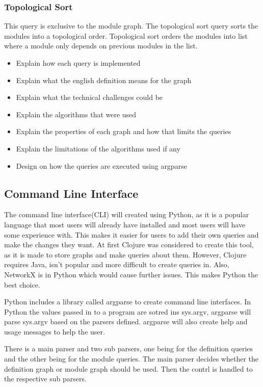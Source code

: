 \subsubsection{Topological Sort}

This query is exclusive to the module graph. The topological sort query sorts
the modules into a topological order. Topological sort orders the modules into
list where a module only depends on previous modules in the list.

\begin{itemize}
\item Explain how each query is implemented 
\item Explain what the english definition means for the graph 
\item Explain what the technical challenges could be 
\item Explain the algorithms that were used 
\item Explain the properties of each graph and how that limits the queries 
\item Explain the limitations of the algorithms used if any 
\item Design on how the queries are executed using argparse
\end{itemize}

\subsection{Command Line Interface}\label{sub:Agda Tree CLI}

The command line interface(CLI) will created using Python, as it is a popular
language that most users will already have installed and most users will have
some experience with. This makes it easier for users to add their own queries
and make the changes they want. At first Clojure was considered to create this
tool, as it is made to store graphs and make queries about them. However,
Clojure requires Java, isn't popular and more difficult to create queries in.
Also, NetworkX is in Python which would cause further issues. This makes Python
the best choice.

Python includes a library called argparse to create command line interfaces. In
Python the values passed in to a program are sotred ins sys.argv, argparse will
parse sys.argv based on the parsers defined. argparse will also create help and
usage messages to help the user.

There is a main parser and two sub parsers, one being for the definition
queries and the other being for the module queries. The main parser decides
whether the definition graph or module graph should be used. Then the contrl is
handled to the respective sub parsers.

